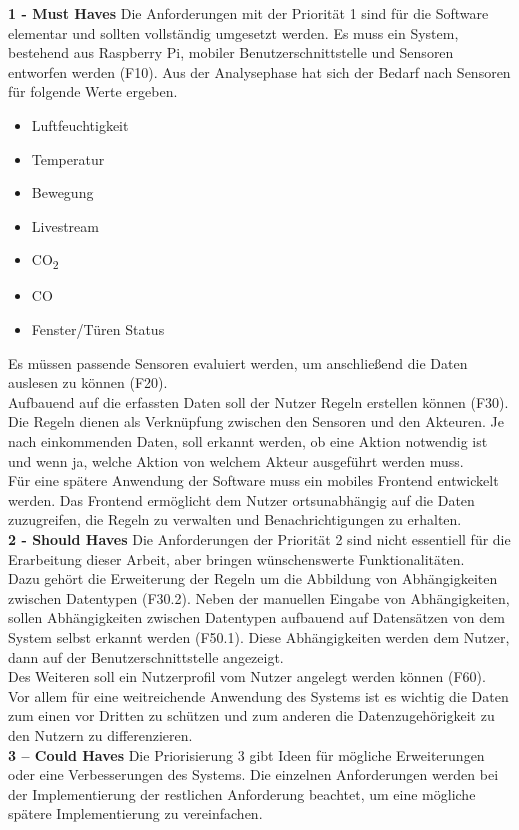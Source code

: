 \textbf{1 - Must Haves}
Die Anforderungen mit der Priorität 1 sind für die Software elementar und sollten vollständig umgesetzt werden. 
Es muss ein System, bestehend aus Raspberry Pi, mobiler Benutzerschnittstelle und Sensoren entworfen werden (F10). Aus der Analysephase hat sich der Bedarf nach Sensoren für folgende Werte ergeben.
\begin{itemize}
\item Luftfeuchtigkeit
\item Temperatur
\item Bewegung
\item Livestream
\item CO\textsubscript{2}
\item CO
\item Fenster/Türen Status
\end{itemize}
Es müssen passende Sensoren evaluiert werden, um anschließend die Daten auslesen zu können (F20).\\
Aufbauend auf die erfassten Daten soll der Nutzer Regeln erstellen können (F30). Die Regeln dienen als Verknüpfung zwischen den Sensoren und den Akteuren. Je nach einkommenden Daten, soll erkannt werden, ob eine Aktion notwendig ist und wenn ja, welche Aktion von welchem Akteur ausgeführt werden muss.\\
Für eine spätere Anwendung der Software muss ein mobiles Frontend entwickelt werden. Das Frontend ermöglicht dem Nutzer ortsunabhängig auf die Daten zuzugreifen, die Regeln zu verwalten und Benachrichtigungen zu erhalten.\\
\textbf{2 - Should Haves}
Die Anforderungen der Priorität 2 sind nicht essentiell für die Erarbeitung dieser Arbeit, aber bringen wünschenswerte Funktionalitäten.\\
Dazu gehört die Erweiterung der Regeln um die Abbildung von Abhängigkeiten zwischen Datentypen (F30.2). Neben der manuellen Eingabe von Abhängigkeiten, sollen Abhängigkeiten zwischen Datentypen aufbauend auf Datensätzen von dem System selbst erkannt werden (F50.1). Diese Abhängigkeiten werden dem Nutzer, dann auf der Benutzerschnittstelle angezeigt.\\
Des Weiteren soll ein Nutzerprofil vom Nutzer angelegt werden können (F60). Vor allem für eine weitreichende Anwendung des Systems ist es wichtig die Daten zum einen vor Dritten zu schützen und zum anderen die Datenzugehörigkeit zu den Nutzern zu differenzieren.\\
\textbf{3 – Could Haves}
Die Priorisierung 3 gibt Ideen für mögliche Erweiterungen oder eine Verbesserungen des Systems. Die einzelnen Anforderungen werden bei der Implementierung der restlichen Anforderung beachtet, um eine mögliche spätere Implementierung zu vereinfachen.\\
